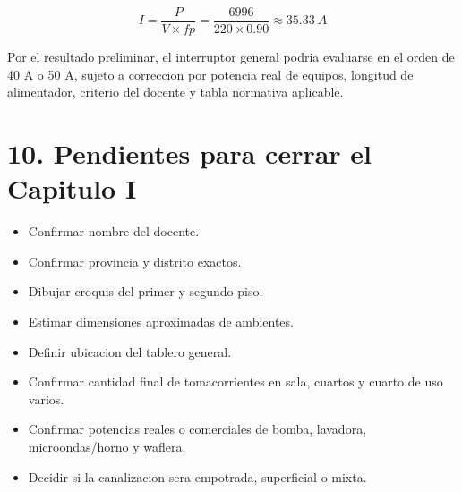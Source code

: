 \documentclass[12pt,a4paper]{article}
\begin{document}
\[
I = \frac{P}{V \times fp} = \frac{6996}{220 \times 0.90} \approx 35.33\ A
\]

Por el resultado preliminar, el interruptor general podria evaluarse en el orden de 40 A o 50 A, sujeto a correccion por potencia real de equipos, longitud de alimentador, criterio del docente y tabla normativa aplicable.

\section*{10. Pendientes para cerrar el Capitulo I}

\begin{itemize}
  \item Confirmar nombre del docente.
  \item Confirmar provincia y distrito exactos.
  \item Dibujar croquis del primer y segundo piso.
  \item Estimar dimensiones aproximadas de ambientes.
  \item Definir ubicacion del tablero general.
  \item Confirmar cantidad final de tomacorrientes en sala, cuartos y cuarto de uso varios.
  \item Confirmar potencias reales o comerciales de bomba, lavadora, microondas/horno y waflera.
  \item Decidir si la canalizacion sera empotrada, superficial o mixta.
\end{itemize}
\end{document}
